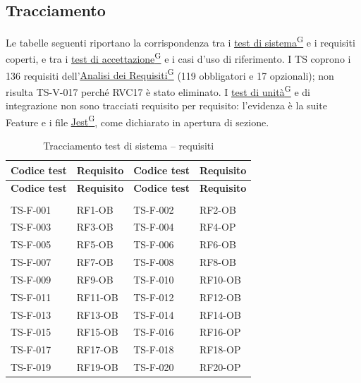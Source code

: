 \documentclass[a4paper,12pt]{article}
\providecommand{\glslink}[2]{\href{https://alittlebyte-19.github.io/Documentazione/glossario.html\#gls-#1}{\underline{#2}\textsuperscript{\scriptsize G}}}
\begin{document}
\subsection{Tracciamento}
Le tabelle seguenti riportano la corrispondenza tra i \glslink{test-di-sistema}{test di sistema} e i requisiti coperti, e tra i \glslink{test-di-accettazione}{test di accettazione} e i casi d'uso di riferimento. I TS coprono i 136 requisiti dell'\glslink{analisi-dei-requisiti-adr}{Analisi dei Requisiti} (119 obbligatori e 17 opzionali); non risulta TS-V-017 perché RVC17 è stato eliminato. I \glslink{test-di-unita}{test di unità} e di integrazione non sono tracciati requisito per requisito: l'evidenza è la suite Feature e i file \glslink{jest}{Jest}, come dichiarato in apertura di sezione.

{\footnotesize
\renewcommand{\arraystretch}{1.1}
\begin{longtable}{|p{2.5cm}|p{2.2cm}|p{2.5cm}|p{2.2cm}|}
    \caption{Tracciamento test di sistema -- requisiti} \label{tab:tracciamento-ts} \\
    \hline
    \rowcolor{gray!20}
    \textbf{Codice test} & \textbf{Requisito} & \textbf{Codice test} & \textbf{Requisito} \\
    \hline
    \endfirsthead
    \hline
    \rowcolor{gray!20}
    \textbf{Codice test} & \textbf{Requisito} & \textbf{Codice test} & \textbf{Requisito} \\
    \hline
    \endhead
    \hline
    \endfoot
    \hline
    \endlastfoot
    \multicolumn{4}{|l|}{\cellcolor{gray!12}\textbf{Funzionali}} \\
    \hline
    TS-F-001 & RF1-OB & TS-F-002 & RF2-OB \\
    \hline
    TS-F-003 & RF3-OB & TS-F-004 & RF4-OP \\
    \hline
    TS-F-005 & RF5-OB & TS-F-006 & RF6-OB \\
    \hline
    TS-F-007 & RF7-OB & TS-F-008 & RF8-OB \\
    \hline
    TS-F-009 & RF9-OB & TS-F-010 & RF10-OB \\
    \hline
    TS-F-011 & RF11-OB & TS-F-012 & RF12-OB \\
    \hline
    TS-F-013 & RF13-OB & TS-F-014 & RF14-OB \\
    \hline
    TS-F-015 & RF15-OB & TS-F-016 & RF16-OP \\
    \hline
    TS-F-017 & RF17-OB & TS-F-018 & RF18-OP \\
    \hline
    TS-F-019 & RF19-OB & TS-F-020 & RF20-OP \\

\end{longtable}}
\end{document}
